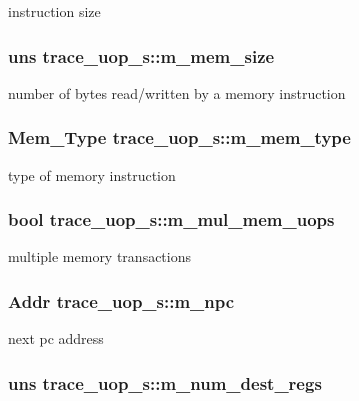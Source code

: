 \label{structtrace__uop__s_a6a3c82bbf6153fbee7bc8dd1bf4552c7}
instruction size \hypertarget{structtrace__uop__s_a75b4e8be6cc570f920a2a7fbb3046244}{
\subsubsection[{m\_\-mem\_\-size}]{\setlength{\rightskip}{0pt plus 5cm}uns {\bf trace\_\-uop\_\-s::m\_\-mem\_\-size}}}
\label{structtrace__uop__s_a75b4e8be6cc570f920a2a7fbb3046244}
number of bytes read/written by a memory instruction \hypertarget{structtrace__uop__s_a7aec327b761f6617dddf0674cca0e4f6}{
\subsubsection[{m\_\-mem\_\-type}]{\setlength{\rightskip}{0pt plus 5cm}Mem\_\-Type {\bf trace\_\-uop\_\-s::m\_\-mem\_\-type}}}
\label{structtrace__uop__s_a7aec327b761f6617dddf0674cca0e4f6}
type of memory instruction \hypertarget{structtrace__uop__s_a2f837ff446dd48875edaafc2cad92a0b}{
\subsubsection[{m\_\-mul\_\-mem\_\-uops}]{\setlength{\rightskip}{0pt plus 5cm}bool {\bf trace\_\-uop\_\-s::m\_\-mul\_\-mem\_\-uops}}}
\label{structtrace__uop__s_a2f837ff446dd48875edaafc2cad92a0b}
multiple memory transactions \hypertarget{structtrace__uop__s_a78f6fffd9b111782913748b7541fc966}{
\subsubsection[{m\_\-npc}]{\setlength{\rightskip}{0pt plus 5cm}Addr {\bf trace\_\-uop\_\-s::m\_\-npc}}}
\label{structtrace__uop__s_a78f6fffd9b111782913748b7541fc966}
next pc address \hypertarget{structtrace__uop__s_a2f05dce7998347a9d31e248e95e6ca3b}{
\subsubsection[{m\_\-num\_\-dest\_\-regs}]{\setlength{\rightskip}{0pt plus 5cm}uns {\bf trace\_\-uop\_\-s::m\_\-num\_\-dest\_\-regs}}}
